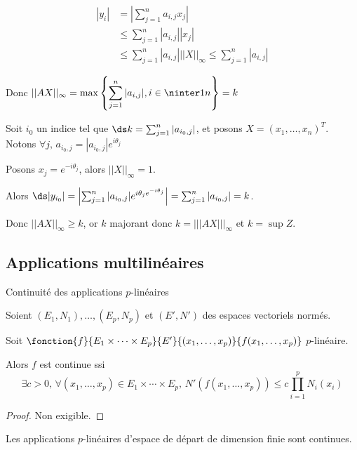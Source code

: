 \begin{align*}
    |y_i| & = \left| \sum_{j=1}^n a_{i, j} x_j \right| \\
    & \leqslant \sum_{j=1}^n |a_{i, j}| |x_j| \\
    & \leqslant \sum_{j=1}^n |a_{i, j}| ||X||_\infty \leqslant \sum_{j=1}^n |a_{i, j}|
\end{align*}

Donc $\displaystyle ||AX||_\infty = \max \left\{ \sum_{j = 1 }^{n } |a_{i, j}|, i \in \ninter 1 n  \right\} = k$

Soit $i_0$ un indice tel que $\ds k = \sum_{j=1}^n |a_{i_0, j}|$, et posons 
$X = (x_1, \ldots, x_n)^T$. Notons $\forall j, \, a_{i_0, j} = |a_{i_0, j}| e^{i \theta_j}$ 

Posons $x_j = e^{-i \theta_j}$, alors $||X||_\infty = 1$.

Alors $\ds |y_{i_0}| = \left|\sum_{j = 1 }^{n } | a_{i_0, j} | e^{i \theta_j e^{-i \theta_j}}\right| = \sum_{j=1}^n |a_{i_0, j}| = k$.

Donc $|| AX||_\infty \geqslant k$, or $k$ majorant donc $k = |||AX |||_\infty$ et $k = \sup Z$. 

\subsection{Applications multilinéaires}

\begin{theoreme}{Continuité des applications $p$-linéaires}{}

    Soient $(E_1, N_1), \ldots, (E_p, N_p)$ et $(E', N')$ des espaces vectoriels normés.
    
    Soit $\fonction{f}{E_1 \times \cdots \times E_p}{E'}{(x_1, \ldots, x_p)}{f(x_1, \ldots, x_p)}$ 
    $p$-linéaire. 

    \avspace Alors $f$ est continue ssi
    \[\exists c > 0, \, \forall (x_1, \ldots, x_p) \in E_1 \times \cdots \times E_p, \, N'(f(x_1, \ldots, x_p)) \leqslant c \prod_{i=1}^p N_i(x_i)\]
\end{theoreme}

\begin{proof}
    Non exigible.
\end{proof}

\begin{proposition}{}{}
    Les applications $p$-linéaires d'espace de départ de dimension finie sont continues.
\end{proposition}


